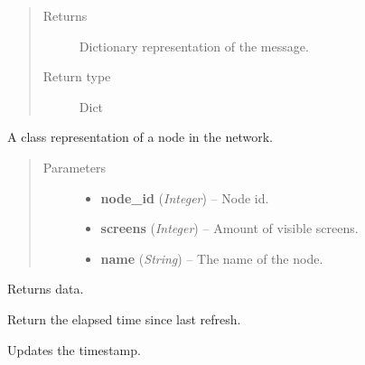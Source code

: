 \documentclass[letterpaper,10pt,english]{sphinxmanual}
\begin{document}
\begin{fulllineitems}
\begin{fulllineitems}
\begin{quote}
\begin{description}
\item[{Returns}] \leavevmode
Dictionary representation of the message.

\item[{Return type}] \leavevmode
Dict

\end{description}\end{quote}

\end{fulllineitems}


\end{fulllineitems}


\begin{fulllineitems}
\label{swnp:swnp.Node}
A class representation of a node in the network.
\begin{quote}\begin{description}
\item[{Parameters}] \leavevmode\begin{itemize}
\item {} 
\textbf{node\_id} (\emph{Integer}) -- Node id.

\item {} 
\textbf{screens} (\emph{Integer}) -- Amount of visible screens.

\item {} 
\textbf{name} (\emph{String}) -- The name of the node.

\end{itemize}

\end{description}\end{quote}

\begin{fulllineitems}
\label{swnp:swnp.Node.data}
Returns data.

\end{fulllineitems}


\begin{fulllineitems}
\label{swnp:swnp.Node.get_age}
Return the elapsed time since last refresh.

\end{fulllineitems}


\begin{fulllineitems}
\label{swnp:swnp.Node.refresh}
Updates the timestamp.

\end{fulllineitems}


\end{fulllineitems}
\end{document}
